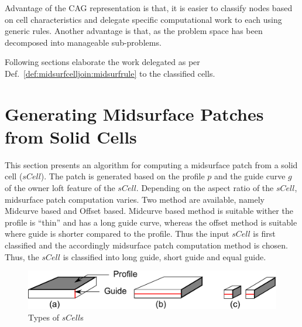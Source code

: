 Advantage of the CAG representation is that, it is easier to classify nodes based on cell characteristics and delegate specific computational work to each using generic rules.  Another advantage is that, as the problem space has been decomposed into manageable sub-problems. 

Following sections elaborate the work delegated as per Def.~\ref{def:midsurfcelljoin:midsurfrule} to the classified cells.

\section{Generating Midsurface Patches from Solid Cells}
\label{sec:midsurfcelljoin:scell}

This section presents an algorithm for computing a midsurface patch from a solid cell ($sCell$). The patch is generated based on the profile $p$ and the guide curve $g$  of the owner loft feature of the $sCell$. Depending on the aspect ratio of the $sCell$, midsurface patch computation varies. Two method are available, namely Midcurve based and Offset based. Midcurve based method is suitable wither the profile is ``thin'' and has a long guide curve, whereas the offset method is suitable where guide is shorter compared to the profile. Thus the input $sCell$ is first classified and the accordingly midsurface patch computation method is chosen. Thus, the $sCell$ is classified into long guide, short guide and equal guide.


  \begin{figure}[!h]
\centering     %
\includegraphics[width=0.75\linewidth,valign=t]{images/typesofscell_1.pdf}
\caption{Types of $sCell$s}
\label{fig:midsurfcelljoin:typesofscell}
\end{figure}



